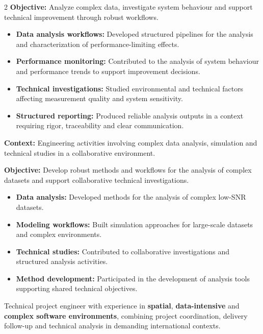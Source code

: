 \documentclass[8pt,a4paper,ragged2e,withhyper]{altacv}
\begin{document}
\begin{paracol}{2}
\textbf{Objective:} Analyze complex data, investigate system behaviour and support technical improvement through robust workflows.

\begin{itemize}
\item \textbf{Data analysis workflows:} Developed structured pipelines for the analysis and characterization of performance-limiting effects.
\item \textbf{Performance monitoring:} Contributed to the analysis of system behaviour and performance trends to support improvement decisions.
\item \textbf{Technical investigations:} Studied environmental and technical factors affecting measurement quality and system sensitivity.
\item \textbf{Structured reporting:} Produced reliable analysis outputs in a context requiring rigor, traceability and clear communication.
\end{itemize}

\divider


\textbf{Context:} Engineering activities involving complex data analysis, simulation and technical studies in a collaborative environment.

\textbf{Objective:} Develop robust methods and workflows for the analysis of complex datasets and support collaborative technical investigations.

\begin{itemize}
\item \textbf{Data analysis:} Developed methods for the analysis of complex low-SNR datasets.
\item \textbf{Modeling workflows:} Built simulation approaches for large-scale datasets and complex environments.
\item \textbf{Technical studies:} Contributed to collaborative investigations and structured analysis activities.
\item \textbf{Method development:} Participated in the development of analysis tools supporting shared technical objectives.
\end{itemize}

\switchcolumn


Technical project engineer with experience in \textbf{spatial}, \textbf{data-intensive} and \textbf{complex software environments}, combining project coordination, delivery follow-up and technical analysis in demanding international contexts.


\end{paracol}
\end{document}
